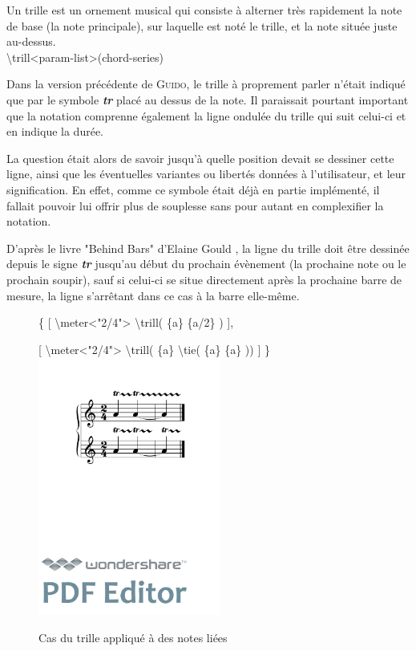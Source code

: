 \documentclass{article}
\newenvironment{code}
  {\fontfamily{pnc}\selectfont}{}
\begin{document}

Un trille est \og{}un ornement musical qui consiste à alterner très rapidement la note de base (la note principale), sur laquelle est noté le trille, et la note située juste au-dessus\fg{}.
\\

\begin{code}
\textbackslash{}trill\textless{}param-list\textgreater{}(chord-series)
\end{code}

Dans la version précédente de \textsc{Guido}, le trille à proprement parler n'était indiqué que par le symbole \textit{\textbf{tr}} placé au dessus de la note. Il paraissait pourtant important que la notation comprenne également la ligne ondulée du trille qui suit celui-ci et en indique la durée.

La question était alors de savoir jusqu'à quelle position devait se dessiner cette ligne, ainsi que les éventuelles variantes ou libertés données à l'utilisateur, et leur signification. En effet, comme ce symbole était déjà en partie implémenté, il fallait pouvoir lui offrir plus de souplesse sans pour autant en complexifier la notation.

D'après le livre "Behind Bars" d'Elaine Gould \cite{ref2}, la ligne du trille doit être dessinée depuis le signe \textit{\textbf{tr}} jusqu'au début du prochain évènement (la prochaine note ou le prochain soupir), sauf si celui-ci se situe directement après la prochaine barre de mesure, la ligne s'arrêtant dans ce cas à la barre elle-même. 

\begin{figure}[h]
\centering
\begin{code}
\{
[ \textbackslash{}meter\textless{}"2/4"\textgreater{} \textbackslash{}trill( \{a\} \{a/2\} ) ],

[ \textbackslash{}meter\textless{}"2/4"\textgreater{} \textbackslash{}trill( \{a\} \textbackslash{}tie( \{a\} \{a\} )) ]
\}
\end{code}
\includegraphics[width=6cm]{img/trill.pdf}
\caption{Cas du trille appliqué à des notes liées}
\label{fig:trill}
\end{figure}
\end{document}
